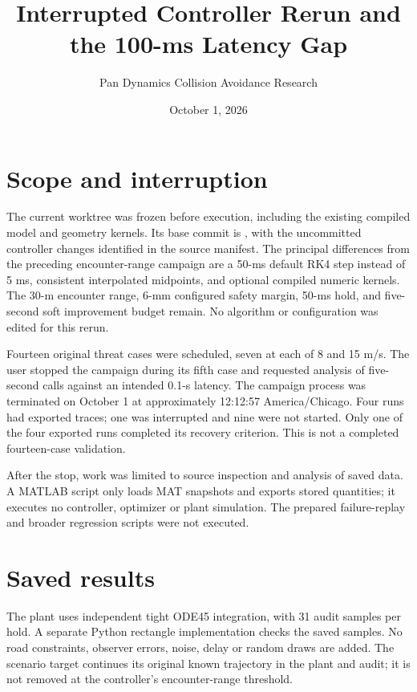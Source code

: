 \documentclass[11pt]{article}
\title{Interrupted Controller Rerun and the 100-ms Latency Gap}
\author{Pan Dynamics Collision Avoidance Research}
\date{October 1, 2026}
\begin{document}
\maketitle

\section{Scope and interruption}
The current worktree was frozen before execution, including the existing
compiled model and geometry kernels. Its base commit is
, with the uncommitted controller changes identified in the
source manifest. The principal differences from the preceding encounter-range
campaign are a 50-ms default RK4 step instead of 5 ms, consistent interpolated
midpoints, and optional compiled numeric kernels. The 30-m encounter range,
6-mm configured safety margin, 50-ms hold, and five-second soft improvement
budget remain. No algorithm or configuration was edited for this rerun.

Fourteen original threat cases were scheduled, seven at each of 8 and 15 m/s.
The user stopped the campaign during its fifth case and requested analysis of
five-second calls against an intended 0.1-s latency. The campaign process was
terminated on October 1 at approximately 12:12:57 America/Chicago. Four runs
had exported traces; one was interrupted and nine were not started. Only one
of the four exported runs completed its recovery criterion. This is not a
completed fourteen-case validation.

After the stop, work was limited to source inspection and analysis of saved
data. A MATLAB script only loads MAT snapshots and exports stored quantities;
it executes no controller, optimizer or plant simulation. The prepared
failure-replay and broader regression scripts were not executed.

\section{Saved results}
The plant uses independent tight ODE45 integration, with 31 audit samples per
hold. A separate Python rectangle implementation checks the saved samples.
No road constraints, observer errors, noise, delay or random draws are added.
The scenario target continues its original known trajectory in the plant
and audit; it is not removed at the controller's encounter-range threshold.
\end{document}
